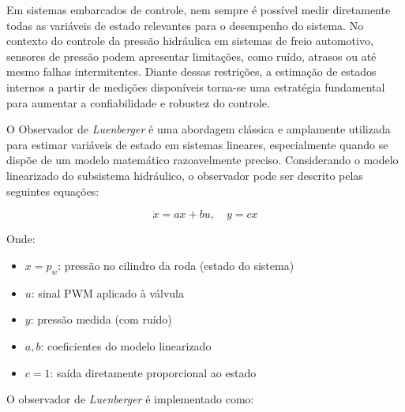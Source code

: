
\label{sec:controle-4-3}
Em sistemas embarcados de controle, nem sempre é possível medir diretamente todas as variáveis de estado relevantes para o desempenho do sistema. No contexto do controle da pressão hidráulica em sistemas de freio automotivo, sensores de pressão podem apresentar limitações, como ruído, atrasos ou até mesmo falhas intermitentes. Diante dessas restrições, a estimação de estados internos a partir de medições disponíveis torna-se uma estratégia fundamental para aumentar a confiabilidade e robustez do controle.

O Observador de \textit{Luenberger} é uma abordagem clássica e amplamente utilizada para estimar variáveis de estado em sistemas lineares, especialmente quando se dispõe de um modelo matemático razoavelmente preciso. Considerando o modelo linearizado do subsistema hidráulico, o observador pode ser descrito pelas seguintes equações:

\begin{equation}
\dot{x} = a x + b u, \quad y = c x
\end{equation}

Onde:
\begin{itemize}
 \item \( x = p_w \): pressão no cilindro da roda (estado do sistema)
 \item \( u \): sinal PWM aplicado à válvula
 \item \( y \): pressão medida (com ruído)
 \item \( a, b \): coeficientes do modelo linearizado
 \item \( c = 1 \): saída diretamente proporcional ao estado
\end{itemize}

O observador de \textit{Luenberger} é implementado como:

